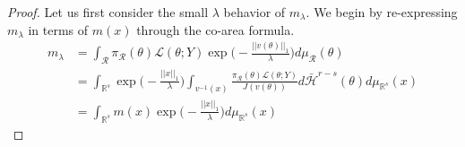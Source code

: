 \documentclass[10pt,fleqn]{article}
\newcommand{\bb}[1]{\mathbb{#1}} \newcommand{\mc}[1]{\mathcal{#1}}
\DeclareMathOperator{\1}{\mathbbm{1}} \DeclareMathOperator{\bigO}{\mc O}
\begin{document}
\begin{proof}
%
%
%
%
%
Let us first consider the small $\lambda$ behavior of $m_\lambda.$ We begin by re-expressing $m_\lambda$ in terms of $m(x)$ through the co-area formula.
\begin{align*}
m_\lambda &= \int_\mathcal{R} \pi_\mathcal{R}(\theta) \mathcal{L}(\theta;Y) \exp\bigg(-\frac{||v(\theta)||_1}{\lambda}\bigg) d\mu_\mathcal{R}(\theta) \\
&= \int_{\mathbb{R}^s} \exp\bigg(-\frac{||x||_1}{\lambda}\bigg) \int_{v^{-1}(x)} \frac{\pi_\mathcal{R}(\theta) \mathcal{L}(\theta;Y)}{J(v(\theta))} d\bar{\mathcal{H}}^{r-s}(\theta) d\mu_{\mathbb{R}^s} (x) \\
&=\int_{\mathbb{R}^s}m(x) \exp\bigg(-\frac{||x||_1}{\lambda}\bigg)d\mu_{\mathbb{R}^s}(x)
\end{align*}


\end{proof}
\end{document}
